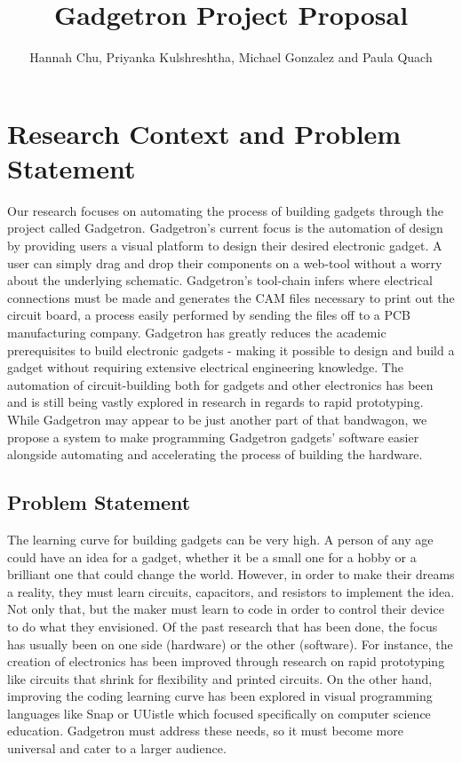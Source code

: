 \documentclass[12pt]{article}
\begin{document}
\author{Hannah Chu, Priyanka Kulshreshtha, Michael Gonzalez and Paula Quach}
\title{Gadgetron Project Proposal}
\maketitle

\section{Research Context and Problem Statement}
Our research focuses on automating the process of building gadgets through the project called Gadgetron. Gadgetron's current focus is the automation of design by providing users a visual platform to design their desired electronic gadget. A user can simply drag and drop their components on a web-tool without a worry about the underlying schematic. Gadgetron's tool-chain infers where electrical connections must be made and generates the CAM files necessary to print out the circuit board, a process easily performed by sending the files off to a PCB manufacturing company. Gadgetron has greatly reduces the academic prerequisites to build electronic gadgets - making it possible to design and build a gadget without requiring extensive electrical engineering knowledge. The automation of circuit-building both for gadgets and other electronics has been and is still being vastly explored in research in regards to rapid prototyping. While Gadgetron may appear to be just another part of that bandwagon, we propose a system to make programming Gadgetron gadgets' software easier alongside automating and accelerating the process of building the hardware.
\subsection{Problem Statement}
The learning curve for building gadgets can be very high. A person of any age could have an idea for a gadget, whether it be a small one for a hobby or a brilliant one that could change the world. However, in order to make their dreams a reality, they must learn circuits, capacitors, and resistors to implement the idea. Not only that, but the maker must learn to code in order to control their device to do what they envisioned. Of the past research that has been done, the focus has usually been on one side (hardware) or the other (software). For instance, the creation of electronics has been improved through research on rapid prototyping like circuits that shrink for flexibility\cite{shrinky} and printed circuits\cite{inkjets}. On the other hand, improving the coding learning curve has been explored in visual programming languages like Snap or UUistle which focused specifically on computer science education\cite{UUistle}. Gadgetron must address these needs, so it must become more universal and cater to a larger audience. \\[7pt]
\end{document}
